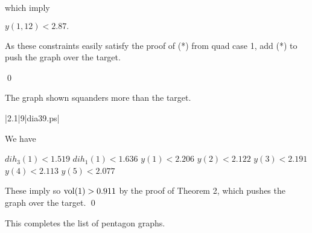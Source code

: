 which imply

$y(1,12)<2.87.$ \newline

As these constraints easily satisfy the proof of (*) from
quad case 1, add (*) to push the graph over the target.

\qed

\bigskip

 The graph shown 
squanders more than the target.  \endproclaim

\gram|2.1|9|dia39.ps|  %


We have 

$dih_3(1) < 1.519$ \newline
$dih_1(1) < 1.636$ \newline
$y(1)<2.206$ \newline
$y(2)<2.122$ \newline
$y(3)<2.191$ \newline
$y(4)<2.113$ \newline
$y(5)<2.077$ \newline

These imply 
so $\operatorname{vol}(1)>0.911$ by the proof of Theorem 2, which pushes the graph over the target. \qed

\bigskip

This completes the list of pentagon graphs.








\bye